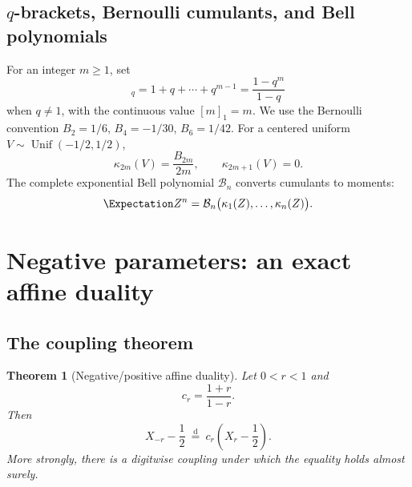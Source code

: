 \documentclass[11pt]{article}
\newtheorem{theorem}{Theorem}[section]
\theoremstyle{definition}
\newcommand{\cump}{\kappa}
\newcommand{\doteqL}{\mathrel{\stackrel{\mathrm d}=}}
\begin{document}
\subsection{$q$-brackets, Bernoulli cumulants, and Bell polynomials}

For an integer \(m\ge1\), set
\begin{equation}
 [m]_q=1+q+\cdots+q^{m-1}=\frac{1-q^m}{1-q}             \label{eq:q-bracket}
\end{equation}
when \(q\ne1\), with the continuous value \([m]_1=m\).  We use the Bernoulli convention
\(B_2=1/6\), \(B_4=-1/30\), \(B_6=1/42\).  For a centered uniform
\(V\sim\operatorname{Unif}(-1/2,1/2)\),
\begin{equation}
 \cump_{2m}(V)=\frac{B_{2m}}{2m},
 \qquad
 \cump_{2m+1}(V)=0.                                    \label{eq:uniform-cumulants}
\end{equation}
The complete exponential Bell polynomial \(\mathcal B_n\) converts cumulants to moments:
\begin{equation}
 \Expectation Z^n=\mathcal B_n\bigl(\cump_1(Z),\ldots,\cump_n(Z)\bigr). \label{eq:bell-moment}
\end{equation}

\section{Negative parameters: an exact affine duality}

\subsection{The coupling theorem}

\begin{theorem}[Negative/positive affine duality]\label{thm:negative-duality}
Let \(0<r<1\) and
\begin{equation}
 c_r=\frac{1+r}{1-r}.                                    \label{eq:cr-def}
\end{equation}
Then
\begin{equation}
 \boxed{
 X_{-r}-\frac12\ \doteqL\ c_r\left(X_r-\frac12\right).}
                                                               \label{eq:negative-duality}
\end{equation}
More strongly, there is a digitwise coupling under which the equality holds almost
surely.
\end{theorem}
\end{document}
